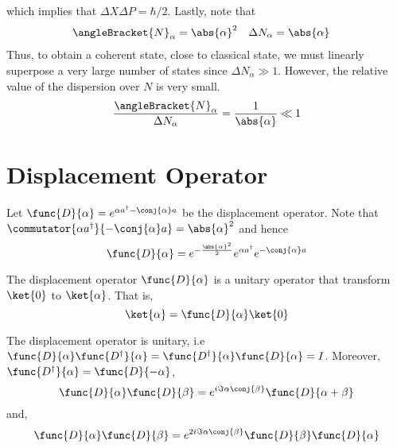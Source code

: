 which implies that \(\Delta X \Delta P = \hbar/2\). Lastly, note that 
\begin{align*}
    \angleBracket{N}_{\alpha} &= \abs{\alpha}^2 & 
    \Delta N_{\alpha} &= \abs{\alpha} 
\end{align*}
Thus, to obtain a coherent state, close to classical state, we must linearly superpose a very large number of states since \(\Delta N_{\alpha} \gg 1\). However, the relative value of the dispersion over \(N\) is very small. 
\begin{equation*}
    \dfrac{\angleBracket{N}_{\alpha}}{\Delta N_{\alpha}} = \dfrac{1}{\abs{\alpha}} \ll 1
\end{equation*}
\section{Displacement Operator}
Let \(\func{D}{\alpha} = e^{\alpha a^{\dagger} - \conj{\alpha} a}\) be the displacement operator. Note that \(\commutator{\alpha a^{\dagger}}{-\conj{\alpha} a} = \abs{\alpha}^2\) and hence 
\begin{equation*}
    \func{D}{\alpha} = e^{-\frac{\abs{\alpha}^2}{2}} e^{\alpha a^{\dagger}} e^{-\conj{\alpha} a}
\end{equation*}

\begin{proposition}
    The displacement operator \(\func{D}{\alpha}\) is a unitary operator that transform \(\ket{0}\) to \(\ket{\alpha}\). That is,
    \begin{equation*}
         \ket{\alpha} = \func{D}{\alpha} \ket{0}
    \end{equation*}
\end{proposition}

\begin{proposition}
    The displacement operator is unitary, i.e \(\func{D}{\alpha} \func{D^{\dagger}}{\alpha} = \func{D^{\dagger}}{\alpha} \func{D}{\alpha} = I\). Moreover, \(\func{D^{\dagger}}{\alpha} = \func{D}{-\alpha}\), 
    \begin{equation*}
        \func{D}{\alpha} \func{D}{\beta} = e^{i \Im \alpha\conj{\beta}} \func{D}{\alpha + \beta}  
    \end{equation*}
    and, 
    \begin{equation*}
        \func{D}{\alpha} \func{D}{\beta} = e^{2 i \Im \alpha\conj{\beta}} \func{D}{\beta}   \func{D}{\alpha} 
    \end{equation*}
\end{proposition}

